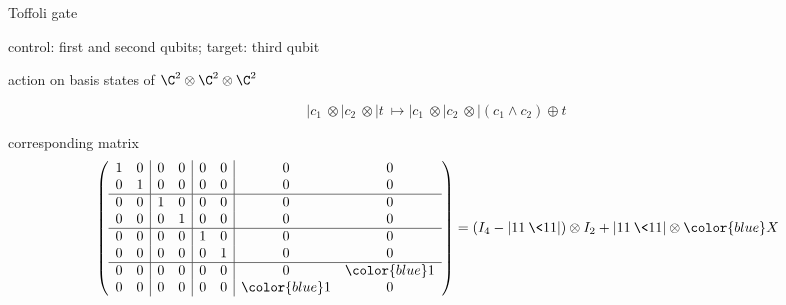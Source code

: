 


\begin{frame}{Toffoli gate}

control: first and second qubits; \quad target: third qubit\quad
{}

\bigskip
action on basis states of $\C^2\otimes\C^2\otimes\C^2$

\[
|c_1\> \otimes |c_2\> \otimes |t\> \mapsto |c_1\> \otimes |c_2\> \otimes |(c_1\land c_2)\oplus t\>
\]

\bigskip
corresponding matrix
\[
\left(
\begin{array}{cc|cc|cc|cc}
1 & 0 & 0 & 0 & 0 & 0 & 0 & 0 \\ 
0 & 1 & 0 & 0 & 0 & 0 & 0 & 0 \\ \hline
0 & 0 & 1 & 0 & 0 & 0 & 0 & 0 \\ 
0 & 0 & 0 & 1 & 0 & 0 & 0 & 0 \\ \hline
0 & 0 & 0 & 0 & 1 & 0 & 0 & 0 \\ 
0 & 0 & 0 & 0 & 0 & 1 & 0 & 0 \\ \hline 
0 & 0 & 0 & 0 & 0 & 0 & 0 & {\color{blue}1} \\ 
0 & 0 & 0 & 0 & 0 & 0 & {\color{blue}1} & 0  
\end{array}
\right)
=
(I_4 - |11\>\<11|) \otimes I_2 + |11\>\<11| \otimes {\color{blue}X}
\]

\end{frame}




